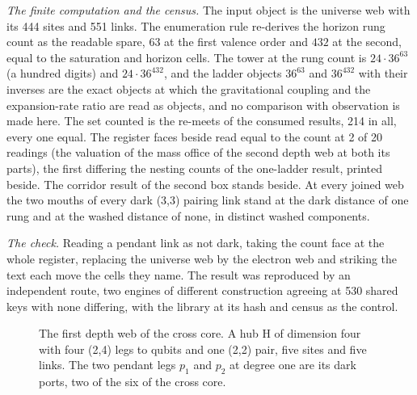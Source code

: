 \begin{chproof}
\textit{The finite computation and the census.} The input object is the universe web with its 444 sites and 551 links. The enumeration rule re-derives the horizon rung count as the readable spare, $63$ at the first valence order and $432$ at the second, equal to the saturation and horizon cells. The tower at the rung count is $24\cdot 36^{63}$ (a hundred digits) and $24\cdot 36^{432}$, and the ladder objects $36^{63}$ and $36^{432}$ with their inverses are the exact objects at which the gravitational coupling and the expansion-rate ratio are read as objects, and no comparison with observation is made here. The set counted is the re-meets of the consumed results, 214 in all, every one equal. The register faces beside read equal to the count at 2 of 20 readings (the valuation of the mass office of the second depth web at both its parts), the first differing the nesting counts of the one-ladder result, printed beside. The corridor result of the second box stands beside. At every joined web the two mouths of every dark (3,3) pairing link stand at the dark distance of one rung and at the washed distance of none, in distinct washed components.

\textit{The check.} Reading a pendant link as not dark, taking the count face at the whole register, replacing the universe web by the electron web and striking the text each move the cells they name. The result was reproduced by an independent route, two engines of different construction agreeing at 530 shared keys with none differing, with the library at its hash and census as the control.
\end{chproof}
\begin{figure}[h]
\centering
{}
\caption{The first depth web of the cross core. A hub H of dimension four with four (2,4) legs to qubits and one (2,2) pair, five sites and five links. The two pendant legs $p_1$ and $p_2$ at degree one are its dark ports, two of the six of the cross core.}
\end{figure}

